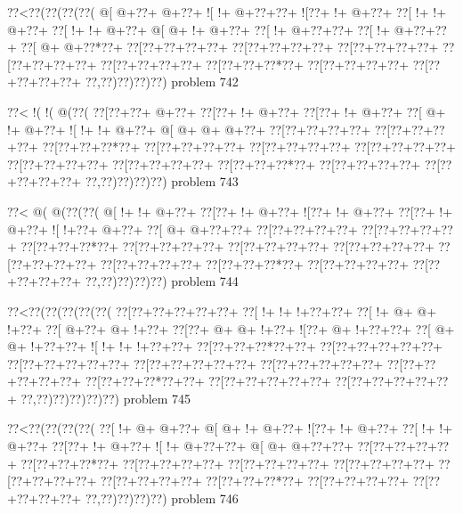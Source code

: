 \vbox{\vbox{\goo
\0??<\0??(\0??(\0??(\0??(
\- @[\- @+\0??+\- @+\0??+
\- ![\- !+\- @+\0??+\0??+
\- ![\0??+\- !+\- @+\0??+
\0??[\- !+\- !+\- @+\0??+
\0??[\- !+\- !+\- @+\0??+
\- @[\- @+\- !+\- @+\0??+
\0??[\- !+\- @+\0??+\0??+
\0??[\- !+\- @+\0??+\0??+
\0??[\- @+\- @+\0??*\0??+
\0??[\0??+\0??+\0??+\0??+
\0??[\0??+\0??+\0??+\0??+
\0??[\0??+\0??+\0??+\0??+
\0??[\0??+\0??+\0??+\0??+
\0??[\0??+\0??+\0??+\0??+
\0??[\0??+\0??+\0??*\0??+
\0??[\0??+\0??+\0??+\0??+
\0??[\0??+\0??+\0??+\0??+
\0??,\0??)\0??)\0??)\0??)
}
\hfil problem 742\hfil\break
}

\vbox{\vbox{\goo
\0??<\- !(\- !(\- @(\0??(
\0??[\0??+\0??+\- @+\0??+
\0??[\0??+\- !+\- @+\0??+
\0??[\0??+\- !+\- @+\0??+
\0??[\- @+\- !+\- @+\0??+
\- ![\- !+\- !+\- @+\0??+
\- @[\- @+\- @+\- @+\0??+
\0??[\0??+\0??+\0??+\0??+
\0??[\0??+\0??+\0??+\0??+
\0??[\0??+\0??+\0??*\0??+
\0??[\0??+\0??+\0??+\0??+
\0??[\0??+\0??+\0??+\0??+
\0??[\0??+\0??+\0??+\0??+
\0??[\0??+\0??+\0??+\0??+
\0??[\0??+\0??+\0??+\0??+
\0??[\0??+\0??+\0??*\0??+
\0??[\0??+\0??+\0??+\0??+
\0??[\0??+\0??+\0??+\0??+
\0??,\0??)\0??)\0??)\0??)
}
\hfil problem 743\hfil\break
}

\vbox{\vbox{\goo
\0??<\- @(\- @(\0??(\0??(
\- @[\- !+\- !+\- @+\0??+
\0??[\0??+\- !+\- @+\0??+
\- ![\0??+\- !+\- @+\0??+
\0??[\0??+\- !+\- @+\0??+
\- ![\- !+\0??+\- @+\0??+
\0??[\- @+\- @+\0??+\0??+
\0??[\0??+\0??+\0??+\0??+
\0??[\0??+\0??+\0??+\0??+
\0??[\0??+\0??+\0??*\0??+
\0??[\0??+\0??+\0??+\0??+
\0??[\0??+\0??+\0??+\0??+
\0??[\0??+\0??+\0??+\0??+
\0??[\0??+\0??+\0??+\0??+
\0??[\0??+\0??+\0??+\0??+
\0??[\0??+\0??+\0??*\0??+
\0??[\0??+\0??+\0??+\0??+
\0??[\0??+\0??+\0??+\0??+
\0??,\0??)\0??)\0??)\0??)
}
\hfil problem 744\hfil\break
}

\vbox{\vbox{\goo
\0??<\0??(\0??(\0??(\0??(\0??(
\0??[\0??+\0??+\0??+\0??+\0??+
\0??[\- !+\- !+\- !+\0??+\0??+
\0??[\- !+\- @+\- @+\- !+\0??+
\0??[\- @+\0??+\- @+\- !+\0??+
\0??[\0??+\- @+\- @+\- !+\0??+
\- ![\0??+\- @+\- !+\0??+\0??+
\0??[\- @+\- @+\- !+\0??+\0??+
\- ![\- !+\- !+\- !+\0??+\0??+
\0??[\0??+\0??+\0??*\0??+\0??+
\0??[\0??+\0??+\0??+\0??+\0??+
\0??[\0??+\0??+\0??+\0??+\0??+
\0??[\0??+\0??+\0??+\0??+\0??+
\0??[\0??+\0??+\0??+\0??+\0??+
\0??[\0??+\0??+\0??+\0??+\0??+
\0??[\0??+\0??+\0??*\0??+\0??+
\0??[\0??+\0??+\0??+\0??+\0??+
\0??[\0??+\0??+\0??+\0??+\0??+
\0??,\0??)\0??)\0??)\0??)\0??)
}
\hfil problem 745\hfil\break
}

\vbox{\vbox{\goo
\0??<\0??(\0??(\0??(\0??(
\0??[\- !+\- @+\- @+\0??+
\- @[\- @+\- !+\- @+\0??+
\- ![\0??+\- !+\- @+\0??+
\0??[\- !+\- !+\- @+\0??+
\0??[\0??+\- !+\- @+\0??+
\- ![\- !+\- @+\0??+\0??+
\- @[\- @+\- @+\0??+\0??+
\0??[\0??+\0??+\0??+\0??+
\0??[\0??+\0??+\0??*\0??+
\0??[\0??+\0??+\0??+\0??+
\0??[\0??+\0??+\0??+\0??+
\0??[\0??+\0??+\0??+\0??+
\0??[\0??+\0??+\0??+\0??+
\0??[\0??+\0??+\0??+\0??+
\0??[\0??+\0??+\0??*\0??+
\0??[\0??+\0??+\0??+\0??+
\0??[\0??+\0??+\0??+\0??+
\0??,\0??)\0??)\0??)\0??)
}
\hfil problem 746\hfil\break
}

